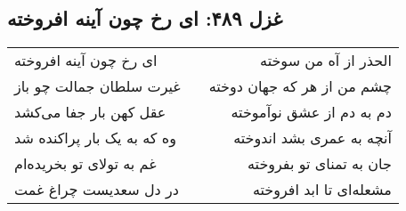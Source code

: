 \begin{center}
\section*{غزل ۴۸۹: ای رخ چون آینه افروخته}
\label{sec:489}
\begin{longtable}{l p{0.5cm} r}
ای رخ چون آینه افروخته
&&
الحذر از آه من سوخته
\\
غیرت سلطان جمالت چو باز
&&
چشم من از هر که جهان دوخته
\\
عقل کهن بار جفا می‌کشد
&&
دم به دم از عشق نوآموخته
\\
وه که به یک بار پراکنده شد
&&
آنچه به عمری بشد اندوخته
\\
غم به تولای تو بخریده‌ام
&&
جان به تمنای تو بفروخته
\\
در دل سعدیست چراغ غمت
&&
مشعله‌ای تا ابد افروخته
\\
\end{longtable}
\end{center}
